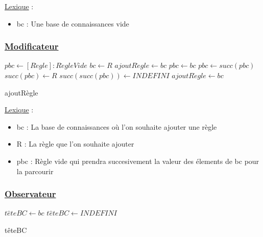 \documentclass{article}
\begin{document}
\underline{Lexique} :
\begin{itemize}
    \item bc : Une base de connaissances vide
\end{itemize}

\subsubsection{\underline{Modificateur}}
\begin{algorithm}
    \SetAlgoLined 
    \KwResult{[BC]}

    \begin{algorithmic}
        \STATE $pbc \gets [R\grave{e}gle] : R\grave{e}gleVide$
            \STATE $bc \gets R$
            \STATE $ajoutR\grave{e}gle \gets bc$
        \ELSE
                \STATE $pbc \gets bc$
                    \STATE $pbc \gets succ(pbc)$
                \ENDWHILE
                 \STATE $succ(pbc) \gets R$
                \STATE $succ(succ(pbc)) \gets INDEFINI$
            \ENDIF
        \ENDIF
        \STATE $ajoutR\grave{e}gle \gets bc$
    \end{algorithmic}
    \caption{ajoutRègle}
\end{algorithm}

\underline{Lexique} :
\begin{itemize}
    \item bc : La base de connaissances où l'on souhaite ajouter une règle
    \item R : La règle que l'on souhaite ajouter
    \item pbc : Règle vide qui prendra succesivement la valeur des élements de bc pour la parcourir
    \
\end{itemize}
\clearpage
\subsubsection{\underline{Observateur}}
\begin{algorithm}
    \SetAlgoLined 
    
    \begin{algorithmic}
           \STATE $t\hat{e}teBC \gets bc$
        \ELSE
            \STATE $t\hat{e}teBC \gets INDEFINI$
        \ENDIF
    \end{algorithmic}
    \caption{têteBC}
\end{algorithm}
\end{document}

